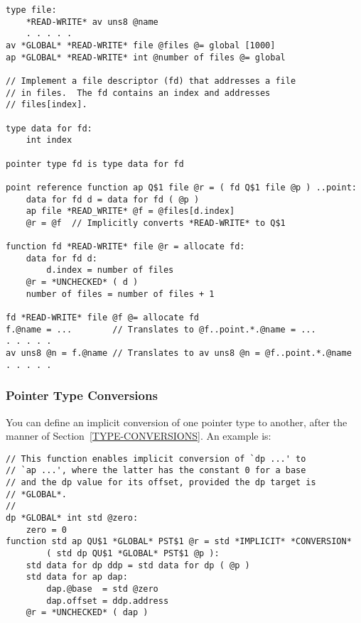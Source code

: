 \documentclass[12pt]{article}
\newenvironment{indpar}[1][0.3in]%
	{\begin{list}{}%
		     {\setlength{\itemsep}{0in}%
		      \setlength{\topsep}{0in}%
		      \setlength{\parsep}{1ex}%
		      \setlength{\labelwidth}{#1}%
		      \setlength{\leftmargin}{#1}%
		      \addtolength{\leftmargin}{\labelsep}}%
	 \item}%
	{\end{list}}
\begin{document}
\begin{indpar}\begin{verbatim}
type file:
    *READ-WRITE* av uns8 @name
    . . . . .
av *GLOBAL* *READ-WRITE* file @files @= global [1000]
ap *GLOBAL* *READ-WRITE* int @number of files @= global

// Implement a file descriptor (fd) that addresses a file
// in files.  The fd contains an index and addresses
// files[index].

type data for fd:
    int index

pointer type fd is type data for fd

point reference function ap Q$1 file @r = ( fd Q$1 file @p ) ..point:
    data for fd d = data for fd ( @p )
    ap file *READ_WRITE* @f = @files[d.index]
    @r = @f  // Implicitly converts *READ-WRITE* to Q$1

function fd *READ-WRITE* file @r = allocate fd:
    data for fd d:
        d.index = number of files
    @r = *UNCHECKED* ( d )
    number of files = number of files + 1

fd *READ-WRITE* file @f @= allocate fd
f.@name = ...        // Translates to @f..point.*.@name = ...
. . . . .
av uns8 @n = f.@name // Translates to av uns8 @n = @f..point.*.@name
. . . . .
\end{verbatim}\end{indpar}

\subsubsection{Pointer Type Conversions}
\label{POINTER-TYPE-CONVERSIONS}

You can define an implicit conversion of one pointer type
to another, after the manner of Section~\ref{TYPE-CONVERSIONS}.
An example is:

\begin{indpar}\begin{verbatim}
// This function enables implicit conversion of `dp ...' to
// `ap ...', where the latter has the constant 0 for a base
// and the dp value for its offset, provided the dp target is
// *GLOBAL*.
//
dp *GLOBAL* int std @zero:
    zero = 0
function std ap QU$1 *GLOBAL* PST$1 @r = std *IMPLICIT* *CONVERSION*
        ( std dp QU$1 *GLOBAL* PST$1 @p ):
    std data for dp ddp = std data for dp ( @p )
    std data for ap dap:
        dap.@base  = std @zero
        dap.offset = ddp.address
    @r = *UNCHECKED* ( dap )
\end{verbatim}\end{indpar}
\end{document}
